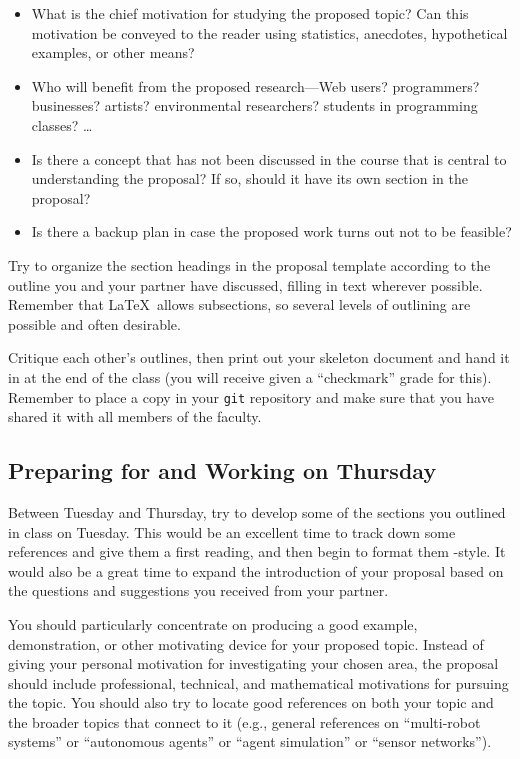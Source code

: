 \vspace*{-.05in}
\begin{itemize}
\itemsep0in

\item
What is the chief motivation for studying the proposed topic? Can this
motivation be conveyed to the reader using statistics, anecdotes, hypothetical
examples, or other means?
\item
Who will benefit from the proposed research---Web users? programmers?
businesses? artists? environmental researchers? students in programming classes?
\ldots
\item
Is there a concept that has not been discussed in the course that is central
to understanding the proposal? If so, should it have its own section in the
proposal?
\item
Is there a backup plan in case the proposed work turns out not to be feasible?
\end{itemize}
\vspace*{-.05in}

 Try to organize the section headings in the proposal template
according to the outline you and your partner have discussed, filling in text
wherever possible. Remember that \LaTeX\ allows subsections, so several
levels of outlining are possible and often desirable.

 Critique each other's outlines, then print out your skeleton document and hand it in at the end
of the class (you will receive given a ``checkmark'' grade for this). Remember to place a copy in your
{\tt git} repository and make sure that you have shared it with all members of the faculty.

\subsection*{Preparing for and Working on Thursday}

Between Tuesday and Thursday, try to develop some of the sections you outlined in class on Tuesday. This would be an
excellent time to track down some references and give them a first reading, and then begin to format them \BibTeX-style. It
would also be a great time to expand the introduction of your proposal based on the questions and suggestions you
received from your partner.

You should particularly concentrate on producing a good example, demonstration, or other motivating device for your
proposed topic. Instead of giving your personal motivation for investigating your chosen area, the proposal should
include professional, technical, and mathematical motivations for pursuing the topic.  You should also try to locate
good references on both your topic and the broader topics that connect to it (e.g., general references on ``multi-robot
systems'' or ``autonomous agents'' or ``agent simulation'' or ``sensor networks'').


